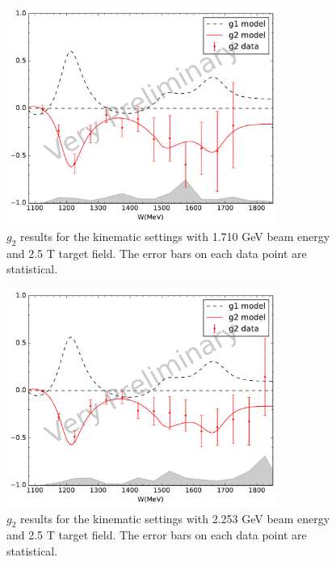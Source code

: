 \begin{figure}[p!]
  \centering
  \includegraphics[width=0.79\textwidth]{figs/g1g2-model-17102590.pdf}
  \caption[$g_2$ results with $E=1.710$ GeV and $B=2.5$ T.]{$g_2$ results for the kinematic settings with 1.710 GeV beam energy and 2.5 T target field. The error bars on each data point are statistical. \label{C8S4F2}}
\end{figure}

\begin{figure}[p!]
  \centering
  \includegraphics[width=0.79\textwidth]{figs/g1g2-model-22532590.pdf}
  \caption[$g_2$ results with $E=2.253$ GeV and $B=2.5$ T.]{$g_2$ results for the kinematic settings with 2.253 GeV beam energy and 2.5 T target field. The error bars on each data point are statistical. \label{C8S4F3}}
\end{figure}

